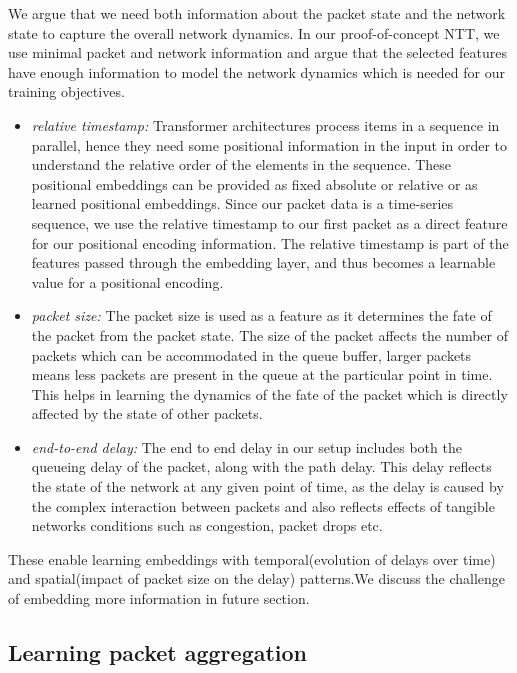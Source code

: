 We argue that we need both information about the packet state and the network state to capture the overall network dynamics. In our proof-of-concept NTT, we use minimal packet and network
information and argue that the selected features have enough information to model the network dynamics which is needed for our training objectives.
\begin{itemize}
\item \emph{relative timestamp:} Transformer architectures process items in a sequence in parallel, hence they need some positional information in the input in order to understand the relative order of the elements in the sequence. These positional embeddings can be provided as fixed absolute\cite{vaswaniAttentionAllYou2017} or relative\cite{shaw2018selfattention} or as learned positional embeddings\cite{gehring2017convolutional}. Since our packet data is a time-series sequence, we use the relative timestamp to our first packet as a direct feature for our positional encoding information. The relative timestamp is part of the features passed through the embedding layer, and thus becomes a learnable value for a positional encoding.
\item \emph{packet size: } The packet size is used as a feature as it determines the fate of the packet from the packet state. The size of the packet affects the number of packets which can be accommodated in the queue buffer, \eg larger packets means less packets are present in the queue at the particular point in time. This helps in learning the dynamics of the fate of the packet which is directly affected by the state of other packets.
\item \emph{end-to-end delay: } The end to end delay in our setup includes both the queueing delay of the packet, along with the path delay. This delay reflects the state of the network at any given point of time, as the delay is caused by the complex interaction between packets and also reflects effects of tangible networks conditions such as congestion, packet drops etc.
\end{itemize}
These enable learning embeddings with temporal(evolution of delays over time) and spatial(impact of packet size on the delay) patterns.We discuss the challenge of embedding more information in future section.


\subsection{Learning packet aggregation}
\label{ssec:desagg}


